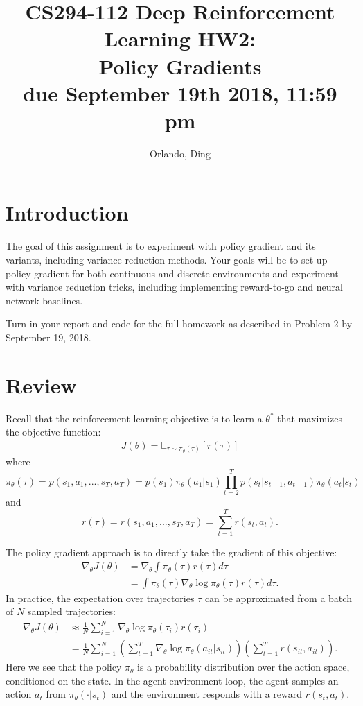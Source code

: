 \documentclass[12pt]{article}
\title{CS294-112 Deep Reinforcement Learning HW2: \\ Policy Gradients\\
\textbf{due September 19th 2018, 11:59 pm}}
\author{
	Orlando, Ding
}
\date{}
\begin{document}
\maketitle

\section{Introduction}
The goal of this assignment is to experiment with policy gradient and its variants, including variance reduction methods. Your goals will be to set up policy gradient for both continuous and discrete environments and experiment with variance reduction tricks, including implementing reward-to-go and neural network baselines.

Turn in your report and code for the full homework as described in Problem 2 by September 19, 2018.

\section{Review}
Recall that the reinforcement learning objective is to learn a $\theta^*$ that maximizes the objective function:
\begin{align} \label{objective}
J(\theta) = \mathbb{E}_{\tau \sim \pi_\theta(\tau)} \left[r(\tau)\right]
\end{align}
where 
$$\pi_\theta(\tau) = p(s_1, a_1, ..., s_T, a_T) = p(s_1)\pi_\theta(a_1|s_1) \prod_{t=2}^T p(s_t | s_{t-1}, a_{t-1}) \pi_\theta(a_t | s_t)$$
and 
$$r(\tau) = r(s_1, a_1, ..., s_T, a_T) = \sum_{t=1}^T r(s_t, a_t).$$

The policy gradient approach is to directly take the gradient of this objective:
\begin{align}
\nabla_\theta J(\theta) &= \nabla_\theta \int \pi_\theta(\tau) r(\tau) d\tau \label{policygradientintegral} \\ 
&= \int \pi_\theta(\tau) \nabla_\theta \log \pi_\theta(\tau) r(\tau) d\tau. \label{scorefunctionpg}
\end{align}
In practice, the expectation over trajectories $\tau$ can be approximated from a batch of $N$ sampled trajectories:
\begin{align}
\nabla_\theta J(\theta) &\approx \frac{1}{N} \sum_{i=1}^N \nabla_\theta \log \pi_\theta(\tau_i) r(\tau_i) \\
&= \frac{1}{N} \sum_{i=1}^N \left(\sum_{t=1}^T \nabla_\theta \log \pi_\theta(a_{it} | s_{it})\right)\left(\sum_{t=1}^T r(s_{it}, a_{it})\right). \label{estimatedscorefunctionpg}
\end{align}
Here we see that the policy $\pi_\theta$ is a probability distribution over the action space, conditioned on the state. In the agent-environment loop, the agent samples an action $a_t$ from $\pi_\theta(\cdot | s_t)$ and the environment responds with a reward $r(s_t, a_t)$.
\end{document}
